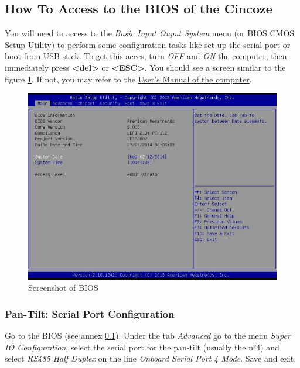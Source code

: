 \subsection{How To Access to the BIOS of the Cincoze}
\label{annex:bios}
You will need to access to the \emph{Basic Input Ouput System} menu
(or BIOS CMOS Setup Utility) to perform some configuration tasks
like set-up the serial port or boot from USB stick. 
To get this acces, turn \emph{OFF} and \emph{ON} the computer, then immediately 
press \textbf{\textless del\textgreater} 
or \textbf{\textless ESC\textgreater}.
You should see a screen similar to the figure
\ref{screen_bios}. If not, you may refer to the
\href{http://www.cincoze.com/data/files/201509/Manual\_DE-1000\_R1.3\_20170621001.pdf}
{User's Manual of the computer}.
\vspace{11pt}

\begin{figure}[!h]
\centering
\includegraphics[scale=.43]{images/bios_screenshot.png}
\caption{Screenshot of BIOS}
\label{screen_bios}
\end{figure}

\subsubsection{Pan-Tilt: Serial Port Configuration}
Go to the BIOS (see annex \ref{annex:bios}). Under the tab \emph{Advanced}
go to the menu \emph{Super IO Configuration}, select the serial port for the 
pan-tilt (usually the n°4) and select \emph{RS485 Half Duplex} on the line 
\emph{Onboard Serial Port 4 Mode}. Save and exit. 

